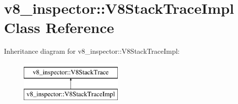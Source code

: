 \hypertarget{classv8__inspector_1_1V8StackTraceImpl}{}\section{v8\+\_\+inspector\+:\+:V8\+Stack\+Trace\+Impl Class Reference}
\label{classv8__inspector_1_1V8StackTraceImpl}
Inheritance diagram for v8\+\_\+inspector\+:\+:V8\+Stack\+Trace\+Impl\+:\begin{figure}[H]
\begin{center}
\leavevmode
\includegraphics[height=2.000000cm]{classv8__inspector_1_1V8StackTraceImpl}
\end{center}
\end{figure}
